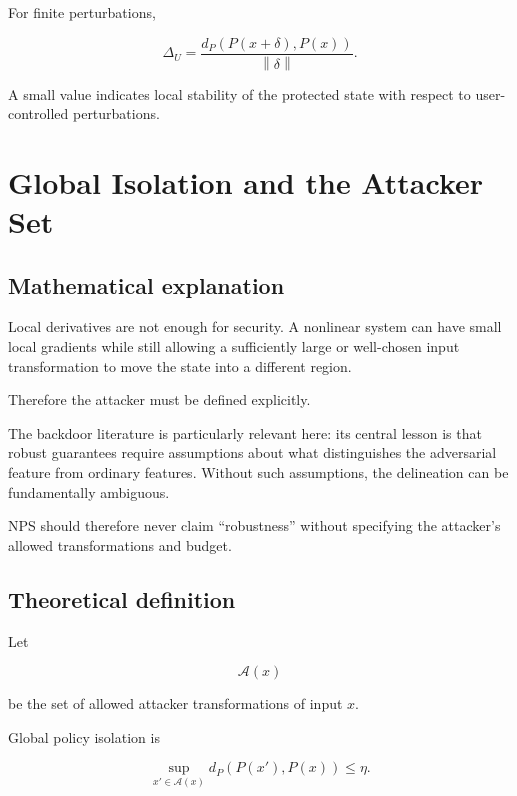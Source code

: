 \documentclass[11pt]{article}
\newcommand{\A}{\mathcal{A}}
\newcommand{\norm}[1]{\left\lVert #1 \right\rVert}
\begin{document}
For finite perturbations,

\begin{equation}
\Delta_U
=
\frac{
d_P(P(x+\delta),P(x))
}{
\norm{\delta}
}.
\end{equation}

A small value indicates local stability of the protected state with respect
to user-controlled perturbations.

\section{Global Isolation and the Attacker Set}

\subsection*{Mathematical explanation}

Local derivatives are not enough for security. A nonlinear system can have
small local gradients while still allowing a sufficiently large or
well-chosen input transformation to move the state into a different region.

Therefore the attacker must be defined explicitly.

The backdoor literature is particularly relevant here: its central lesson is
that robust guarantees require assumptions about what distinguishes the
adversarial feature from ordinary features. Without such assumptions, the
delineation can be fundamentally ambiguous.

NPS should therefore never claim ``robustness'' without specifying the
attacker's allowed transformations and budget.

\subsection*{Theoretical definition}

Let

\begin{equation}
\A(x)
\end{equation}

be the set of allowed attacker transformations of input $x$.

Global policy isolation is

\begin{equation}
\boxed{
\sup_{x'\in\A(x)}
d_P\!\left(P(x'),P(x)\right)
\leq\eta.
}
\end{equation}
\end{document}
